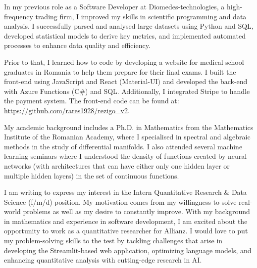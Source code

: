 \documentclass[11pt, a4paper]{awesome-cv}
\begin{document}
\makecvheader[R]

\makecvfooter
  {}
  {}
  {}

\makelettertitle

\begin{cvletter}

In my previous role as a Software Developer at Diomedes-technologies, a high-frequency trading firm, I improved my skills in scientific programming and data analysis. I successfully parsed and analysed large datasets using Python and SQL, developed statistical models to derive key metrics, and implemented automated processes to enhance data quality and efficiency.

Prior to that, I learned how to code by developing a website for medical school graduates in Romania to help them prepare for their final exams. I built the front-end using JavaScript and React (Material-UI) and developed the back-end with Azure Functions (C\#) and SQL. Additionally, I integrated Stripe to handle the payment system. The front-end code can be found at: \url{https://github.com/rares1928/rezigo_v2}.

My academic background includes a Ph.D. in Mathematics from the Mathematics Institute of the Romanian Academy, where I specialised in spectral and algebraic methods in the study of differential manifolds. I also attended several machine learning seminars where I understood the density of functions created by neural networks (with architectures that can have either only one hidden layer or multiple hidden layers) in the set of continuous functions.


I am writing to express my interest in the Intern Quantitative Research \& Data Science (f/m/d) position. My motivation comes from my willingness to solve real-world problems as well as my desire to constantly improve. With my background in mathematics and experience in software development, I am excited about the opportunity to work as a quantitative researcher for Allianz. I would love to put my problem-solving skills to the test by tackling challenges that arise in developing the Streamlit-based web application, optimizing language models, and enhancing quantitative analysis with cutting-edge research in AI.


\end{cvletter}
\end{document}
